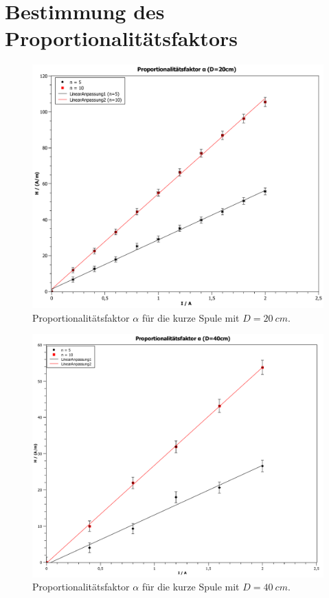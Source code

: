 \section{Bestimmung des Proportionalitätsfaktors}

\begin{figure}[H]
    \hspace{-5mm}
    \centering
    \includegraphics[width=.7\textwidth]{prop20.pdf}
    \caption[Proportionalitätsfaktor für D=20cm]{Proportionalitätsfaktor $\alpha$ für die kurze Spule mit $D=\SI{20}{cm}$.}
    \label{fig:20prop}
\end{figure}

\par\bigskip

\begin{figure}[H]
    \centering
    \includegraphics[width=.7\textwidth]{prop40.pdf}
    \caption[Proportionalitätsfaktor für D=40cm]{Proportionalitätsfaktor $\alpha$ für die kurze Spule mit $D=\SI{40}{cm}$.}
    \label{fig:40prop}
\end{figure}

